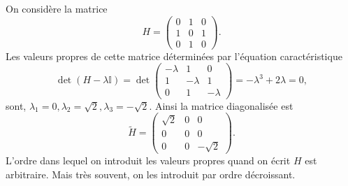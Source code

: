 \begin{example}
On considère la matrice
\begin{equation}
H=\begin{pmatrix}
0 & 1 & 0\\
1 & 0 & 1\\
0 & 1 & 0
\end{pmatrix} .
\end{equation}
Les valeurs propres de cette matrice déterminées par l'équation caractéristique%
\begin{equation}
\det(H-\lambda\mathbb{I})=\det
\begin{pmatrix}
-\lambda & 1 & 0\\
1 & -\lambda & 1\\
0 & 1 & -\lambda
\end{pmatrix}
=-\lambda^{3}+2\lambda=0,
\end{equation}
sont, $\lambda_1=0,\lambda_{2}=\sqrt{2},\lambda_3=-\sqrt{2}$. Ainsi la
matrice diagonalisée est
\begin{equation}
\tilde{H}=\begin{pmatrix}
\sqrt{2} & 0 & 0\\
0 & 0 & 0\\
0 & 0 & -\sqrt{2}
\end{pmatrix}.
\end{equation}
L'ordre dans lequel on introduit les valeurs propres quand on écrit $H$ est
arbitraire. Mais très souvent, on les introduit par ordre décroissant.


\end{example}
